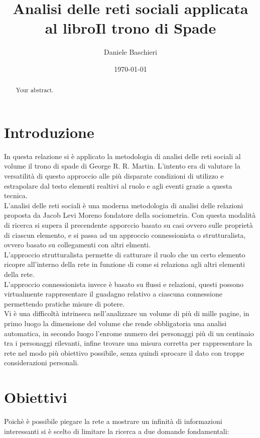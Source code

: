 \documentclass[a4paper]{article}
\title{Analisi delle reti sociali applicata al libro\newline Il trono di Spade}
\author{Daniele Baschieri}
\date{\today}
\begin{document}
\maketitle

\begin{abstract}
Your abstract.
\end{abstract}

\section{Introduzione}

In questa relazione si è applicato la metodologia di analisi delle reti sociali al volume il trono di spade di George R. R. Martin. L'intento era di valutare la versatilità di questo approccio alle più disparate condizioni di utilizzo e estrapolare dal testo elementi realtivi al ruolo e agli eventi grazie a questa tecnica.\\
L'analisi delle reti sociali è una moderna metodologia di analisi delle relazioni proposta da Jacob Levi Moreno fondatore della sociometria. 
Con questa modalità di ricerca si supera il precendente apporccio basato su casi ovvero sulle proprietà di ciascun elemento, e si passa ad un approccio connessionista o strutturalista, ovvero basato su collegamenti con altri elmenti.\\
L'approccio strutturalista permette di catturare il ruolo che un certo elemento ricopre all'interno della rete in funzione di come si relaziona agli altri elementi della rete.\\
L'approccio connessionista invece è basato su flussi e relazioni, questi possono virtualmente rappresentare il guadagno relativo a ciascuna connessione permettendo pratiche misure di potere.\\
Vi è una difficoltà intrinseca nell'analizzare un volume di più di mille pagine, in primo luogo la dimensione del volume che rende obbligatoria una analisi automatica, in secondo luogo l'enrome numero dei personaggi più di un centinaio tra i personaggi rilevanti, infine trovare una misura corretta per rappresentare la rete nel modo più obiettivo possibile, senza quindi sprocare il dato con troppe considerazioni personali.

\section{Obiettivi}

Poichè è possibile piegare la rete a mostrare un infinità di informazioni interessanti si è scelto di limitare la ricerca a due domande fondamentali:
\end{document}
